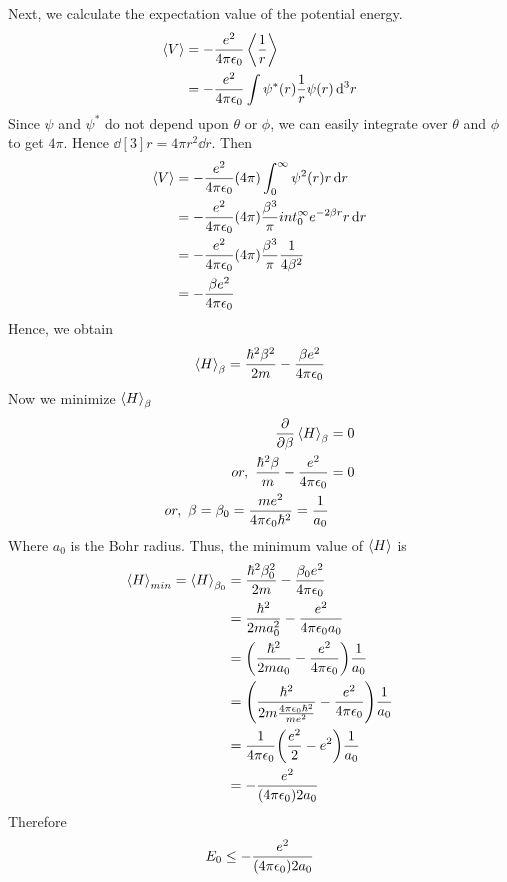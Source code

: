 		Next, we calculate the expectation value of the potential energy.
		\begin{align*}
			\expval{V} &= -\frac{e^2}{4\pi \epsilon_0} \expval{\frac{1}{r}}\\
			&= -\frac{e^2}{4\pi \epsilon_0} \int \psi^*\qty(r) \frac{1}{r} \psi\qty(r) \dd[3]{r}
		\end{align*}
		Since $\psi$ and $\psi^*$ do not depend upon $\theta$ or $\phi$, we can easily integrate over $\theta$ and $\phi$ to get $4\pi$. Hence $\dd[3]{r} = 4 \pi r^2 \dd{r}$. Then
		\begin{align*}
			\expval{V} 
			&= - \frac{e^2}{4 \pi \epsilon_0} \qty(4\pi) \int_{0}^{\infty} \psi^2\qty(r) r \dd{r}\\
			&= - \frac{e^2}{4 \pi \epsilon_0} \qty(4\pi) \frac{\beta^3}{\pi} int_{0}^{\infty} e^{-2\beta r} r \dd{r}\\
			&= - \frac{e^2}{4 \pi \epsilon_0} \qty(4\pi) \frac{\beta^3}{\pi} \frac{1}{4\beta^2}\\
			&= - \frac{\beta e^2}{4 \pi \epsilon_0}
		\end{align*}
		Hence, we obtain
		\begin{align*}
			\expval{H}_\beta = \frac{\hbar^2 \beta^2}{2 m } - \frac{\beta e^2}{4\pi \epsilon_0}
		\end{align*}
		Now we minimize $\expval{H}_\beta$
		\begin{align*}
			\pdv{}{\beta} \expval{H}_\beta &= 0\\
			or, \ \frac{\hbar^2 \beta}{m} - \frac{e^2}{4\pi\epsilon_0} &= 0 \\
			or, \ \beta=\beta_0 = \frac{m e^2}{4\pi \epsilon_0 \hbar^2} = \frac{1}{a_0}
		\end{align*}
		Where $a_0$ is the Bohr radius. Thus, the minimum value of $\expval{H}$ is 
		\begin{align*}
			\expval{H}_{min} =  \expval{H}_{\beta_0} &= \frac{\hbar^2\beta_0^2}{2 m} - \frac{\beta_0 e^2}{4 \pi \epsilon_0}\\
			&= \frac{\hbar^2}{2 m a_0^2} - \frac{e^2}{4\pi \epsilon_0 a_0}\\
			&= \qty(\frac{\hbar^2}{2 m a_0}  -  \frac{e^2}{4\pi \epsilon_0}) \frac{1}{a_0} \\
			&= \qty(\frac{\hbar^2}{2 m \frac{4\pi \epsilon_0 \hbar^2}{m e^2}}  -  \frac{e^2}{4\pi \epsilon_0}) \frac{1}{a_0} \\
			&= \frac{1}{4\pi \epsilon_0} \qty(\frac{e^2}{2} - e^2) \frac{1}{a_0}\\
			&= - \frac{e^2}{\qty(4\pi \epsilon_0) 2 a_0}
		\end{align*}
		Therefore
		\begin{align*}
			E_0 \leq - \frac{e^2}{\qty(4\pi \epsilon_0) 2 a_0}
		\end{align*}
		
